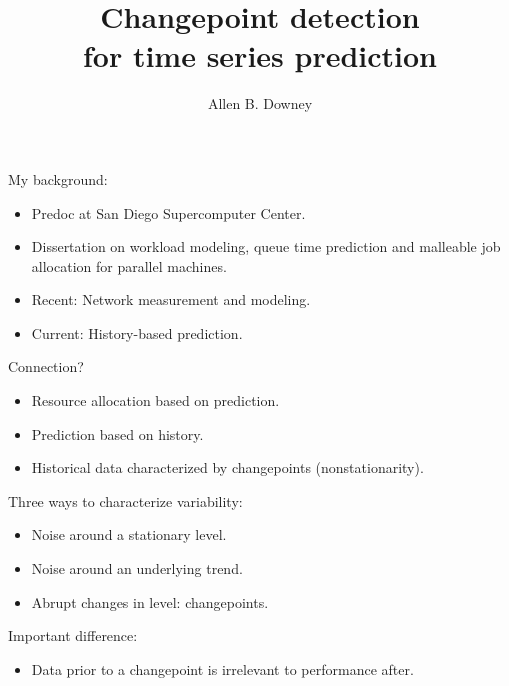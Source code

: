 \documentclass[pdf,letterpaper,allen]{prosper}
\title{Changepoint detection \\for time series prediction}
\author{Allen B. Downey}
\begin{document}
\maketitle

\begin{slide}{}

My background:

\begin{itemize}

\item Predoc at San Diego Supercomputer Center.

\item Dissertation on workload modeling, queue time prediction
  and malleable job allocation for parallel machines.

\item Recent: Network measurement and modeling.

\item Current: History-based prediction.

\end{itemize}
\end{slide}



\begin{slide}{}

Connection?

\begin{itemize}

\item Resource allocation based on {\blue prediction}.

\item Prediction based on {\blue history}.

\item Historical data characterized by {\blue changepoints} (nonstationarity).

\end{itemize}
\end{slide}



\begin{slide}{}

Three ways to characterize variability:

\begin{itemize}

\item Noise around a stationary level.

\item Noise around an underlying trend.

\item Abrupt changes in level: {\red changepoints}.

\end{itemize}

Important difference:

\begin{itemize}

\item Data prior to a changepoint is irrelevant to
performance after.

\end{itemize}

\end{slide}
\end{document}
